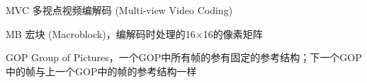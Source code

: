 \begin{denotation}

\item[MVC]	多视点视频编解码 (Multi-view Video Coding)
\item[MB]	宏块 (Macroblock)，编解码时处理的16$\times$16的像素矩阵
\item[GOP]	Group of Pictures，一个GOP中所有帧的参有固定的参考结构；下一个GOP中的帧与上一个GOP中的帧的参考结构一样
\end{denotation}
